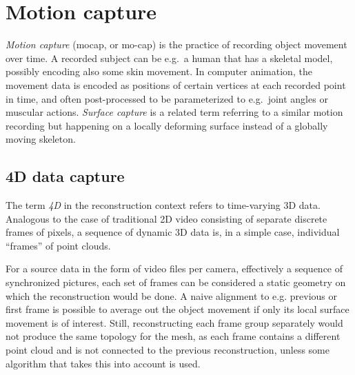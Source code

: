 \clearpage
\section{Motion capture} \label{sec:motioncapture} %

\emph{Motion capture} (mocap, or mo-cap) is the practice of recording object movement over time.
A recorded subject can be e.g.\ a human that has a skeletal model, possibly encoding also some skin movement.
In computer animation, the movement data is encoded as positions of certain vertices at each recorded point in time, and often post-processed to be parameterized to e.g.\ joint angles or muscular actions. \cite{deng2007computer,waters1987muscle}
\emph{Surface capture} is a related term referring to a similar motion recording but happening on a locally deforming surface instead of a globally moving skeleton.



\subsection{4D data capture} %

The term \emph{4D} in the reconstruction context refers to time-varying 3D data.
Analogous to the case of traditional 2D video consisting of separate discrete frames of pixels, a sequence of dynamic 3D data is, in a simple case, individual ``frames'' of point clouds.

For a source data in the form of video files per camera, effectively a sequence of synchronized pictures, each set of frames can be considered a static geometry on which the reconstruction would be done.
A naive alignment to e.g. previous or first frame is possible to average out the object movement if only its local surface movement is of interest.
Still, reconstructing each frame group separately would not produce the same topology for the mesh, as each frame contains a different point cloud and is not connected to the previous reconstruction, unless some algorithm that takes this into account is used.

